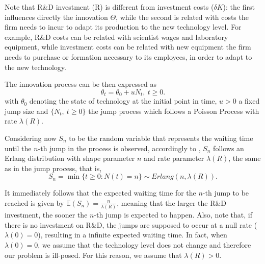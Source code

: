 
Note that R\&D investment (R) is different from investment costs ($\delta K$): the first influences directly the innovation $\Theta$, while the second is related with costs the firm needs to incur to adapt its production to the new technology level.
For example, R\&D costs can be related with scientist wages and laboratory equipment, while investment costs can be related with new equipment the firm needs to purchase or formation necessary to its employees, in order to adapt to the new technology.



The innovation process can be then expressed as
$$\theta_t=\theta_0+uN_t, \ t\geq 0.$$ 
with $\theta_0$ denoting the state of technology at the initial point in time, $u>0$ a fixed jump size and $\{ N_t, \ t \geq 0 \}$ the jump process which follows a Poisson Process with rate $\lambda(R)$. 

Considering now $S_n$ to be the random variable that represents the waiting time until the $n$-th jump in the process is observed, accordingly to \cite{ross}, $S_n$ follows an Erlang distribution with shape parameter $n$ and rate parameter $\lambda(R)$, the same as in the jump process, that is,
$$S_n=\min \{t\geq 0: N(t)=n \} \sim Erlang(n,\lambda(R)).$$

It immediately follows that the expected waiting time for the $n$-th jump to be reached is given by $\mathds{E}(S_n)=\frac{n}{\lambda(R)}$, meaning that the larger the R\&D investment, the sooner the $n$-th jump is expected to happen. Also, note that, if there is no investment on R\&D, the jumps are supposed to occur at a null rate ($\lambda(0)=0$), resulting in a infinite expected waiting time. In fact, when $\lambda(0)=0$, we assume that the technology level does not change and therefore our problem is ill-posed. For this reason, we assume that $\lambda(R)>0$.

